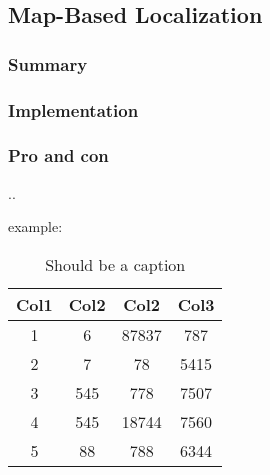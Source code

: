 \subsection{Map-Based Localization} %
\subsubsection*{Summary} 
\subsubsection*{Implementation}
\subsubsection*{Pro and con}
..



example:
\begin{table}[h!]
\centering
 \begin{tabular}{||c c c c||} 
 \hline
 Col1 & Col2 & Col2 & Col3 \\ [0.5ex] 
 \hline\hline
 1 & 6 & 87837 & 787 \\ 
 2 & 7 & 78 & 5415 \\
 3 & 545 & 778 & 7507 \\
 4 & 545 & 18744 & 7560 \\
 5 & 88 & 788 & 6344 \\ [1ex] 
 \hline
 \end{tabular}
 \caption {Should be a caption}
\end{table}
